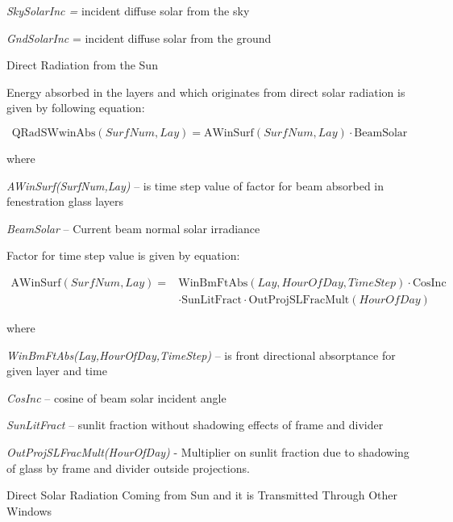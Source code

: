 \emph{SkySolarInc =} incident diffuse solar from the sky

\emph{GndSolarInc} = incident diffuse solar from the ground

Direct Radiation from the Sun

Energy absorbed in the layers and which originates from direct solar radiation is given by following equation:

\begin{equation}
\text{QRadSWwinAbs}(SurfNum, Lay) = \text{AWinSurf}(SurfNum, Lay) \cdot \text{BeamSolar}
\end{equation}

where

\emph{AWinSurf(SurfNum,Lay)} -- is time step value of factor for beam absorbed in fenestration glass layers

\emph{BeamSolar} -- Current beam normal solar irradiance

Factor for time step value is given by equation:

\begin{equation}
\begin{split}
\text{AWinSurf}(SurfNum,Lay) =& \text{WinBmFtAbs}(Lay,HourOfDay,TimeStep) \cdot \text{CosInc} \\
&\cdot \text{SunLitFract} \cdot \text{OutProjSLFracMult}(HourOfDay)
\end{split}
\end{equation}

where

\emph{WinBmFtAbs(Lay,HourOfDay,TimeStep)} -- is front directional absorptance for given layer and time

\emph{CosInc} -- cosine of beam solar incident angle

\emph{SunLitFract} -- sunlit fraction without shadowing effects of frame and divider

\emph{OutProjSLFracMult(HourOfDay)} - Multiplier on sunlit fraction due to shadowing of glass by frame and divider outside projections.

Direct Solar Radiation Coming from Sun and it is Transmitted Through Other Windows

